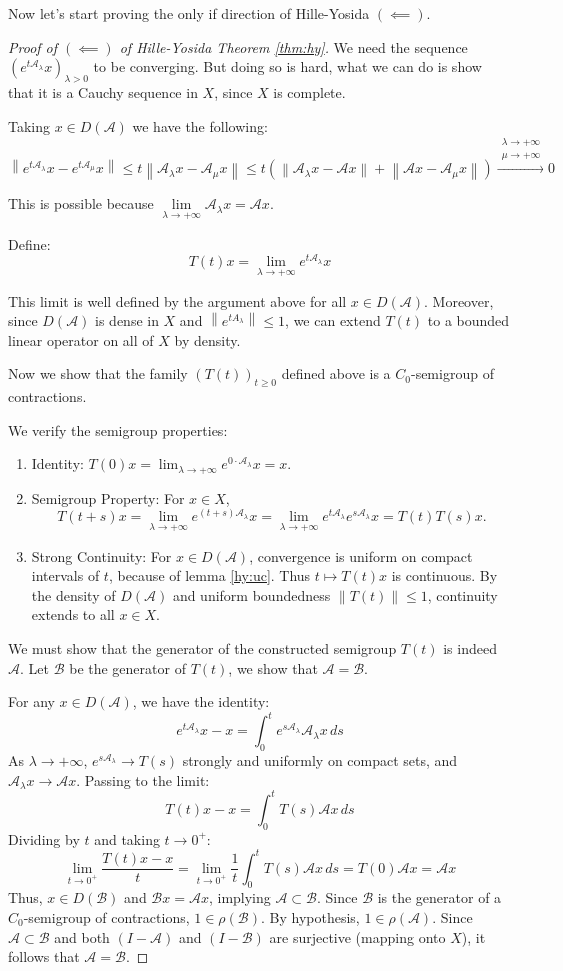 \documentclass[12pt, oneside]{book}
\newcommand{\norm}[1]{\left\lVert#1\right\rVert}
\newcommand{\A}{\mathscr{A}}
\newcommand{\B}{\mathscr{B}}
\begin{document}
\bigskip

Now let's start proving the only if direction of Hille-Yosida $(\impliedby)$.

\begin{proof}[Proof of $(\impliedby)$ of Hille-Yosida Theorem \ref{thm:hy}]
We need the sequence $(e^{t\A_\lambda}x)_{\lambda > 0}$ to be converging. But doing so is hard, what we can do is show that it is a Cauchy sequence in $X$, since $X$ is complete.

Taking $x \in D(\A)$ we have the following:
$$
	\norm{e^{t\A_\lambda}x - e^{t\A_\mu}x} \le t\norm{\A_\lambda x - \A_\mu x} \le t(\norm{\A_\lambda x - \A x} + \norm{\A x - \A_\mu x}) \xrightarrow{\substack{\lambda \to +\infty \\ \mu \to +\infty}} 0
$$

This is possible because $\lim\limits_{\lambda \to +\infty} {\A_\lambda x} = \A x$.

Define:
$$
	T(t)x = \lim_{\lambda \to +\infty} {e^{t\A_\lambda}x}
$$

This limit is well defined by the argument above for all $x \in D(\A)$. Moreover, since $D(\A)$ is dense in $X$ and $\norm{e^{tA_\lambda}} \le 1$, we can extend $T(t)$ to a bounded linear operator on all of $X$ by density.

Now we show that the family $(T(t))_{t \ge 0}$ defined above is a $C_0$-semigroup of contractions.

We verify the semigroup properties:
\begin{enumerate}
    \item Identity: $T(0)x = \lim_{\lambda \to +\infty} e^{0 \cdot \A_\lambda}x = x$.
    \item Semigroup Property: For $x \in X$,
    $$
    T(t+s)x = \lim_{\lambda \to +\infty} e^{(t+s)\A_\lambda}x = \lim_{\lambda \to +\infty} e^{t\A_\lambda} e^{s\A_\lambda}x = T(t)T(s)x.
    $$
\item Strong Continuity: For $x \in D(\A)$, convergence is uniform on compact intervals of $t$, because of lemma \ref{hy:uc}. Thus $t \mapsto T(t)x$ is continuous. By the density of $D(\A)$ and uniform boundedness $\norm{T(t)} \le 1$, continuity extends to all $x \in X$.
\end{enumerate}

We must show that the generator of the constructed semigroup $T(t)$ is indeed $\A$. Let $\B$ be the generator of $T(t)$, we show that $\A = \B$.

For any $x \in D(\A)$, we have the identity:
$$
e^{t\A_\lambda}x - x = \int_0^t e^{s\A_\lambda} \A_\lambda x \, ds
$$
As $\lambda \to +\infty$, $e^{s\A_\lambda} \to T(s)$ strongly and uniformly on compact sets, and $\A_\lambda x \to \A x$. Passing to the limit:
$$
T(t)x - x = \int_0^t T(s) \A x \, ds
$$
Dividing by $t$ and taking $t \to 0^+$:
$$
\lim_{t \to 0^+} \frac{T(t)x - x}{t} = \lim_{t \to 0^+} \frac{1}{t} \int_0^t T(s) \A x \, ds = T(0)\A x = \A x
$$
Thus, $x \in D(\B)$ and $\B x = \A x$, implying $\A \subset \B$.
Since $\B$ is the generator of a $C_0$-semigroup of contractions, $1 \in \rho(\B)$. By hypothesis, $1 \in \rho(\A)$. Since $\A \subset \B$ and both $(I-\A)$ and $(I-\B)$ are surjective (mapping onto $X$), it follows that $\A = \B$.
\end{proof}
\end{document}
